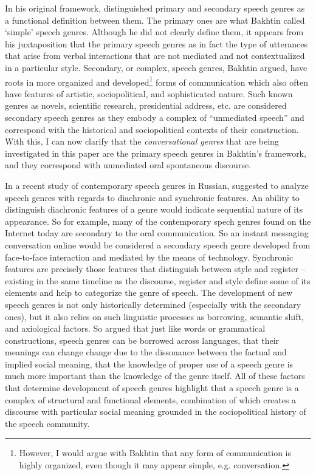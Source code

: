 \documentclass[12pt]{article}
\begin{document}
In his original framework, \textcite{bakhtin1986} distinguished primary and secondary speech genres as a functional definition between them. The primary ones are what Bakhtin called `simple' speech genres. Although he did not clearly define them, it appears from his juxtaposition that the primary speech genres as in fact the type of utterances that arise from verbal interactions that are not mediated and not contextualized in a particular style. Secondary, or complex, speech genres, Bakhtin argued, have roots in more organized and developed\footnote{However, I would argue with Bakhtin that any form of communication is highly organized, even though it may appear simple, e.g. conversation.} forms of communication which also often have features of artistic, sociopolitical, and sophisticated nature. Such known genres as novels, scientific research, presidential address, etc. are considered secondary speech genres as they embody a complex of ``unmediated speech'' and correspond with the historical and sociopolitical contexts of their construction. With this, I can now clarify that the \textit{conversational genres} that are being investigated in this paper are the primary speech genres in Bakhtin's framework, and they correspond with unmediated oral spontaneous discourse.

In a recent study of contemporary speech genres in Russian, \textcite{dementyev2015} suggested to analyze speech genres with regards to diachronic and synchronic features. An ability to distinguish diachronic features of a genre would indicate sequential nature of its appearance. So for example, many of the contemporary spech genres found on the Internet today are secondary to the oral communication. So an instant messaging conversation online would be considered a secondary speech genre developed from face-to-face interaction and mediated by the means of technology. Synchronic features are precisely those features that distinguish between style and register -- existing in the same timeline as the discourse, register and style define some of its elements and help to categorize the genre of speech. The development of new speech genres is not only historically determined (especially with the secondary ones), but it also relies on such linguistic processes as borrowing, semantic shift, and axiological factors. So \textcite[p. 81-82]{dementyev2015} argued that just like words or grammatical constructions, speech genres can be borrowed across languages, that their meanings can change change due to the dissonance between the factual and implied social meaning, that the knowledge of proper use of a speech genre is much more important than the knowledge of the genre itself. All of these factors that determine development of speech genres highlight that a speech genre is a complex of structural and functional elements, combination of which creates a discourse with particular social meaning grounded in the sociopolitical history of the speech community. 
\end{document}
